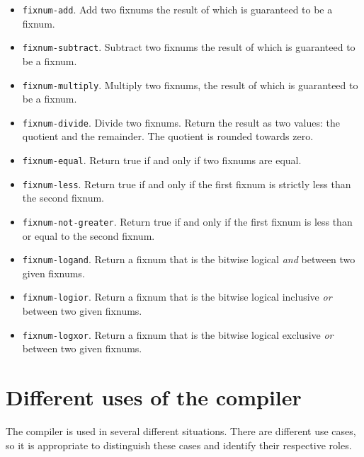 \begin{itemize}
\item \texttt{fixnum-add}.  Add two fixnums the result of which is
  guaranteed to be a fixnum.
\item \texttt{fixnum-subtract}.  Subtract two fixnums the result of
  which is guaranteed to be a fixnum.
\item \texttt{fixnum-multiply}.  Multiply two fixnums, the result of
  which is guaranteed to be a fixnum.
\item \texttt{fixnum-divide}.  Divide two fixnums.  Return the result
  as two values: the quotient and the remainder.  The quotient is
  rounded towards zero.
\item \texttt{fixnum-equal}.  Return true if and only if two fixnums
  are equal.
\item \texttt{fixnum-less}.  Return true if and only if the first
  fixnum is strictly less than the second fixnum.
\item \texttt{fixnum-not-greater}.  Return true if and only if the first
  fixnum is less than or equal to the second fixnum.
\item \texttt{fixnum-logand}.  Return a fixnum that is the bitwise
  logical \emph{and} between two given fixnums.
\item \texttt{fixnum-logior}.  Return a fixnum that is the bitwise
  logical inclusive \emph{or} between two given fixnums.
\item \texttt{fixnum-logxor}.  Return a fixnum that is the bitwise
  logical exclusive \emph{or} between two given fixnums.
\end{itemize}


\section{Different uses of the compiler}
\label{sec-different-uses-of-the-compiler}

The compiler is used in several different situations.  There are
different use cases, so it is appropriate to distinguish these cases
and identify their respective roles.

